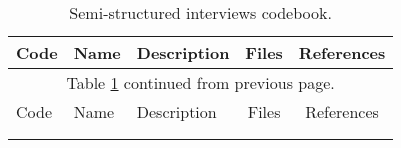 \begin{landscape}
\footnotesize
\singlespacing
\renewcommand\thetable{A\arabic{table}}
\begin{longtable}[c]{@{}ll p{6cm}cc@{}}
\caption[Codebook]{Semi-structured interviews codebook. \label{tab:codebook}} \\

\toprule
Code & Name & Description & Files & References \\ 
\endfirsthead

\multicolumn{5}{c}{Table \ref{tab:codebook} continued from previous page.}\\
\toprule
Code & Name & Description & Files & References \\ 
\midrule
\endhead

\bottomrule \\
\endfoot

\bottomrule
\endlastfoot


\end{longtable}
\end{landscape}
